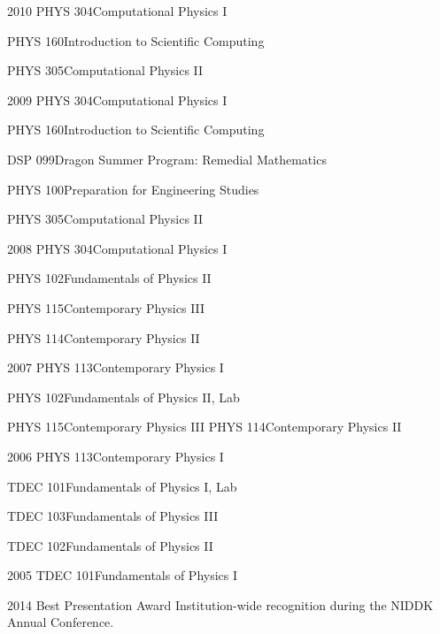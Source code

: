 \documentclass[]{scrartcl}
\begin{document}
\begin{cleanCV}
\Teaching
{2010}
{PHYS 304}{Computational Physics I\TeachingNote}

\Teaching
{}
{PHYS 160}{Introduction to Scientific Computing\TeachingNote}

\Teaching
{}
{PHYS 305}{Computational Physics II\TeachingNote}

\Teaching
{2009}
{PHYS 304}{Computational Physics I\TeachingNote}

\Teaching
{}
{PHYS 160}{Introduction to Scientific Computing\TeachingNote}

\Teaching
{}
{DSP 099}{Dragon Summer Program: Remedial Mathematics}

\Teaching
{}
{PHYS 100}{Preparation for Engineering Studies}


\Teaching
{}
{PHYS 305}{Computational Physics II\TeachingNote}

\Teaching
{2008}
{PHYS 304}{Computational Physics I\TeachingNote}

\Teaching
{}
{PHYS 102}{Fundamentals of Physics II\TeachingNote}

\Teaching
{}
{PHYS 115}{Contemporary Physics III\TeachingNote}

\Teaching
{}
{PHYS 114}{Contemporary Physics II\TeachingNote}

\Teaching
{2007}
{PHYS 113}{Contemporary Physics I\TeachingNote}

\Teaching
{}
{PHYS 102}{Fundamentals of Physics II, Lab}

\Teaching
{}
{PHYS 115}{Contemporary Physics III\TeachingNote}
\Teaching
{}
{PHYS 114}{Contemporary Physics II\TeachingNote}

\Teaching
{2006}
{PHYS 113}{Contemporary Physics I\TeachingNote}

\Teaching
{}
{TDEC 101}{Fundamentals of Physics I, Lab}

\Teaching
{}
{TDEC 103}{Fundamentals of Physics III\TeachingNote}

\Teaching
{}
{TDEC 102}{Fundamentals of Physics II\TeachingNote}

\Teaching
{2005}
{TDEC 101}{Fundamentals of Physics I\TeachingNote}




\WorkExperienceX
{2014}
{Best Presentation Award}
{Institution-wide recognition during the NIDDK Annual Conference.}


\end{cleanCV}
\end{document}
